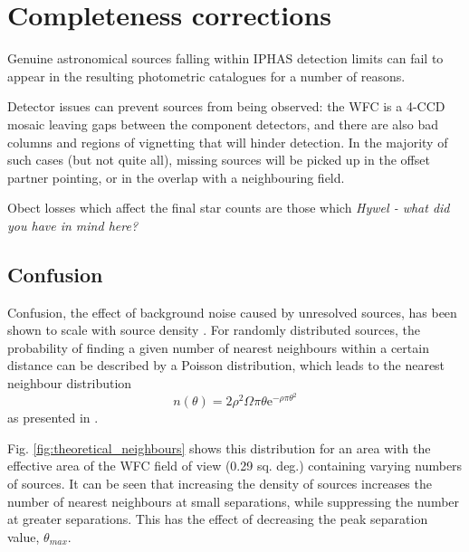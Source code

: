 \documentclass[a4paper,useAMS,usenatbib]{mn2e}
\begin{document}


\section[]{Completeness corrections} 
\label{sec:completeness}

Genuine astronomical sources falling within IPHAS detection limits can fail to
appear in the resulting photometric catalogues for a number of reasons.

Detector issues can prevent sources from being observed: the WFC is a 4-CCD mosaic leaving gaps
between the component detectors, and there are also bad columns and regions of
vignetting that will hinder detection. In the majority of such cases (but not quite all),
missing sources will be picked up in the offset partner pointing, or in the overlap with a 
neighbouring field.

Obect losses which affect the final star counts are those which {\sl Hywel - what did you have in mind here?}

\subsection{Confusion}

Confusion, the effect of background noise caused by unresolved sources, has been shown to scale with source density \citep{Condon1974}. For randomly distributed sources, the probability of finding a given number of nearest neighbours within a certain distance can be described by a Poisson distribution, which leads to the nearest neighbour distribution 
\begin{equation}
n(\theta) = 2\rho^2\Omega\pi\theta\mathrm{e}^{-\rho\pi\theta^2}
\label{eq:theoretical_neighbours}
\end{equation}
\noindent as presented in \citet{Bahcall1986}.

Fig. \ref{fig:theoretical_neighbours} shows this distribution for an area with the effective area of the WFC field of view (0.29 sq. deg.) containing varying numbers of sources. It can be seen that increasing the density of sources increases the number of nearest neighbours at small separations, while
suppressing the number at greater separations. This has the effect of decreasing the peak separation value, $\theta_{max}$.
\end{document}
